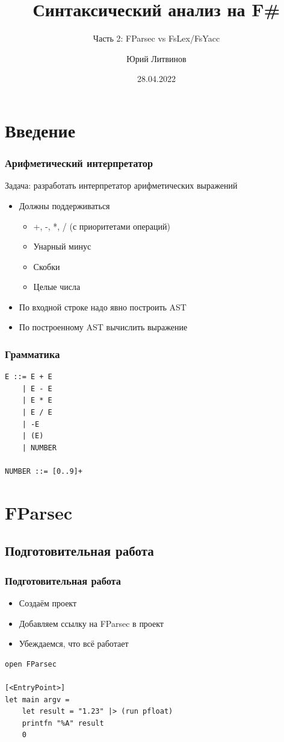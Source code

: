 \documentclass[xetex,mathserif,serif]{beamer}
\title{Синтаксический анализ на F\#}
\subtitle{Часть 2: FParsec vs FsLex/FsYacc}
\author{Юрий Литвинов}
\date{28.04.2022}
\begin{document}
    
    \frame{\titlepage}

    \section{Введение}
    
    \begin{frame}
        \frametitle{Арифметический интерпретатор}
        Задача: разработать интерпретатор арифметических выражений
        \begin{itemize}
            \item Должны поддерживаться 
            \begin{itemize}
                \item +, -, *, / (с приоритетами операций)
                \item Унарный минус
                \item Скобки
                \item Целые числа
            \end{itemize}
            \item По входной строке надо явно построить AST
            \item По построенному AST вычислить выражение
        \end{itemize}
    \end{frame}

    \begin{frame}[fragile]
        \frametitle{Грамматика}
        \begin{verbatim}
E ::= E + E
    | E - E
    | E * E
    | E / E
    | -E
    | (E)
    | NUMBER

NUMBER ::= [0..9]+
        \end{verbatim}
    \end{frame}

    \section{FParsec}

    \subsection{Подготовительная работа}

    \begin{frame}[fragile]
        \frametitle{Подготовительная работа}
        \begin{itemize}
            \item Создаём проект
            \item Добавляем ссылку на FParsec в проект
            \item Убеждаемся, что всё работает
        \end{itemize}
        \begin{verbatim}
open FParsec

[<EntryPoint>]
let main argv =
    let result = "1.23" |> (run pfloat)
    printfn "%A" result
    0 
        \end{verbatim}
    \end{frame}
\end{document}

